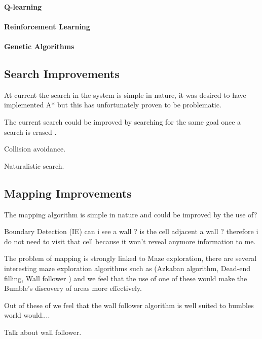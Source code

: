 \documentclass[a4paper,oneside]{report}
\begin{document}
\paragraph{Q-learning}
		
\paragraph{Reinforcement Learning}
		
\paragraph{Genetic Algorithms}
	
\subsection{Search Improvements}
		At current the search in the system is simple in nature, it was desired to have implemented A* but this has unfortunately proven to be problematic.
		
		The current search could be improved by searching for the same goal once a search is erased .
		
		
		Collision avoidance.
		
		Naturalistic search. 
		
	\subsection{Mapping Improvements}
		The mapping algorithm is simple in nature and could be improved by the use of? 
		
		Boundary Detection (IE) can i see a wall ? is the cell adjacent a wall ? therefore i do not need to visit that cell because it won't reveal anymore information to me. 
	
		The problem of mapping is strongly linked to Maze exploration, there are several interesting maze exploration algorithms such as (Azkaban algorithm, Dead-end filling, Wall follower ) and we feel that the use of one of these would make the Bumble's discovery of areas more effectively. 
	
		Out of these of  we feel that the wall follower algorithm is well suited to bumbles world would.... 
		
		Talk about wall follower.
\end{document}
